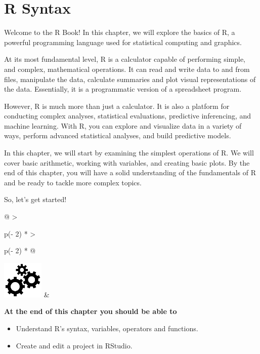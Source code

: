 \documentclass[
]{book}
\begin{document}
\hypertarget{r-syntax}{%
\chapter{R Syntax}\label{r-syntax}}

Welcome to the R Book! In this chapter, we will explore the basics of R, a powerful programming language used for statistical computing and graphics.

At its most fundamental level, R is a calculator capable of performing simple, and complex, mathematical operations. It can read and write data to and from files, manipulate the data, calculate summaries and plot visual representations of the data. Essentially, it is a programmatic version of a spreadsheet program.

However, R is much more than just a calculator. It is also a platform for conducting complex analyses, statistical evaluations, predictive inferencing, and machine learning. With R, you can explore and visualize data in a variety of ways, perform advanced statistical analyses, and build predictive models.

In this chapter, we will start by examining the simplest operations of R. We will cover basic arithmetic, working with variables, and creating basic plots. By the end of this chapter, you will have a solid understanding of the fundamentals of R and be ready to tackle more complex topics.

So, let's get started!

\hfill\break

\begin{longtable}[]{@{}
  >{\raggedright\arraybackslash}p{(\columnwidth - 2\tabcolsep) * }
  >{\raggedright\arraybackslash}p{(\columnwidth - 2\tabcolsep) * }@{}}
\toprule\noalign{}
\endhead
\bottomrule\noalign{}
\endlastfoot
\includegraphics[width=\textwidth,height=0.70833in]{images/03.png} & \begin{minipage}[t]{\linewidth}\raggedright
\textbf{At the end of this chapter you should be able to}

\begin{itemize}
\item
  Understand R's syntax, variables, operators and functions.
\item
  Create and edit a project in RStudio.
\end{itemize}
\end{minipage} \\
\end{longtable}
\end{document}
